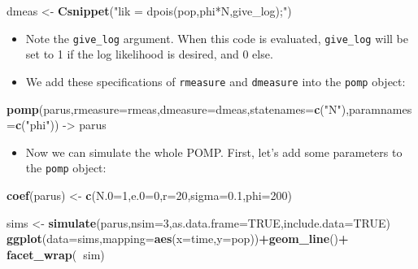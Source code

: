 \documentclass[]{article}
\newenvironment{Shaded}{\begin{snugshade}}{\end{snugshade}}
\newcommand{\KeywordTok}[1]{\textcolor[rgb]{0.13,0.29,0.53}{\textbf{#1}}}
\newcommand{\DataTypeTok}[1]{\textcolor[rgb]{0.13,0.29,0.53}{#1}}
\newcommand{\DecValTok}[1]{\textcolor[rgb]{0.00,0.00,0.81}{#1}}
\newcommand{\FloatTok}[1]{\textcolor[rgb]{0.00,0.00,0.81}{#1}}
\newcommand{\StringTok}[1]{\textcolor[rgb]{0.31,0.60,0.02}{#1}}
\newcommand{\OtherTok}[1]{\textcolor[rgb]{0.56,0.35,0.01}{#1}}
\newcommand{\OperatorTok}[1]{\textcolor[rgb]{0.81,0.36,0.00}{\textbf{#1}}}
\newcommand{\NormalTok}[1]{#1}
\providecommand{\tightlist}{%
  \setlength{\itemsep}{0pt}\setlength{\parskip}{0pt}}
\begin{document}
\begin{Shaded}
\begin{Highlighting}[]
\NormalTok{dmeas <-}\StringTok{ }\KeywordTok{Csnippet}\NormalTok{(}\StringTok{"lik = dpois(pop,phi*N,give_log);"}\NormalTok{)}
\end{Highlighting}
\end{Shaded}

\begin{itemize}
\item
  Note the \texttt{give\_log} argument. When this code is evaluated,
  \texttt{give\_log} will be set to 1 if the log likelihood is desired,
  and 0 else.
\item
  We add these specifications of \texttt{rmeasure} and \texttt{dmeasure}
  into the \texttt{pomp} object:
\end{itemize}

\begin{Shaded}
\begin{Highlighting}[]
\KeywordTok{pomp}\NormalTok{(parus,}\DataTypeTok{rmeasure=}\NormalTok{rmeas,}\DataTypeTok{dmeasure=}\NormalTok{dmeas,}\DataTypeTok{statenames=}\KeywordTok{c}\NormalTok{(}\StringTok{"N"}\NormalTok{),}\DataTypeTok{paramnames=}\KeywordTok{c}\NormalTok{(}\StringTok{"phi"}\NormalTok{)) ->}\StringTok{ }\NormalTok{parus}
\end{Highlighting}
\end{Shaded}

\begin{itemize}
\tightlist
\item
  Now we can simulate the whole POMP. First, let's add some parameters
  to the \texttt{pomp} object:
\end{itemize}

\begin{Shaded}
\begin{Highlighting}[]
\KeywordTok{coef}\NormalTok{(parus) <-}\StringTok{ }\KeywordTok{c}\NormalTok{(}\DataTypeTok{N.0=}\DecValTok{1}\NormalTok{,}\DataTypeTok{e.0=}\DecValTok{0}\NormalTok{,}\DataTypeTok{r=}\DecValTok{20}\NormalTok{,}\DataTypeTok{sigma=}\FloatTok{0.1}\NormalTok{,}\DataTypeTok{phi=}\DecValTok{200}\NormalTok{)}
\end{Highlighting}
\end{Shaded}

\begin{Shaded}
\begin{Highlighting}[]
\NormalTok{sims <-}\StringTok{ }\KeywordTok{simulate}\NormalTok{(parus,}\DataTypeTok{nsim=}\DecValTok{3}\NormalTok{,}\DataTypeTok{as.data.frame=}\OtherTok{TRUE}\NormalTok{,}\DataTypeTok{include.data=}\OtherTok{TRUE}\NormalTok{)}
\KeywordTok{ggplot}\NormalTok{(}\DataTypeTok{data=}\NormalTok{sims,}\DataTypeTok{mapping=}\KeywordTok{aes}\NormalTok{(}\DataTypeTok{x=}\NormalTok{time,}\DataTypeTok{y=}\NormalTok{pop))}\OperatorTok{+}\KeywordTok{geom_line}\NormalTok{()}\OperatorTok{+}
\StringTok{  }\KeywordTok{facet_wrap}\NormalTok{(}\OperatorTok{~}\NormalTok{sim)}
\end{Highlighting}
\end{Shaded}
\end{document}
